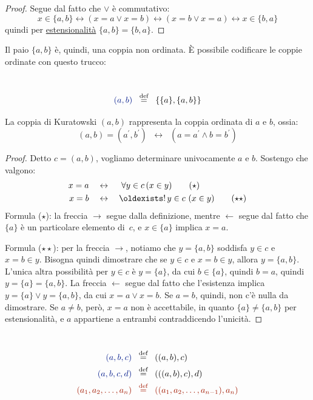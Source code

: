 \begin{proof}
	Segue dal fatto che $\lor$ \`e commutativo:
	\[ x \in \{a,b\} \leftrightarrow (x = a \lor x = b) \leftrightarrow (x = b \lor x = a) \leftrightarrow x \in \{b,a\}
		\]
	quindi per \hyperref[ax2]{estensionalit\`a} $\{a,b\} = \{b,a\}$.
\end{proof}

Il paio $\{a,b\}$ \`e, quindi, una coppia non ordinata. \`E possibile
codificare le coppie ordinate con questo trucco:

\begin{definition}
\ \\
\baselineskip
	\[{\drkblu (a,b)} \;\;\Mydef\;\; \{\{a\},\{a,b\}\}
		\]
\end{definition}

\begin{proposition}
	La coppia di Kuratowski $(a,b)$ rappresenta la coppia ordinata di
$a$ e $b$, ossia:
	\[ (a,b) = (a^{\prime},b^{\prime}) \;\;\leftrightarrow\;\; (a = a^{\prime} \land b = b^{\prime})
		\]
\end{proposition}

\begin{proof}
	Detto $c = (a,b)$, vogliamo determinare univocamente $a$ e $b$.
Sostengo che valgono:
\begin{align*}
	x = a &\quad\leftrightarrow\quad \phantom{!}\forall {y \in c} \,(x \in y)
\tag{$\star$}\\
	x = b &\quad\leftrightarrow\quad \existsun {y \in c} \,(x \in y)
\tag{$\star\star$}
\end{align*}
	Formula ($\star$): la freccia $\rightarrow$ segue dalla definizione, mentre
$\leftarrow$ segue dal fatto che $\{a\}$ \`e un particolare elemento
di~$c$, e $x\in\{a\}$ implica $x=a$.

	Formula ($\star\star$): per la freccia $\rightarrow$, notiamo che
$y=\{a,b\}$ soddisfa $y\in c$ e $x=b\in y$. Bisogna quindi dimostrare che
se $y\in c$ e $x=b\in y$, allora $y=\{a,b\}$. L'unica altra possibilit\`a
per $y\in c$ \`e $y=\{a\}$, da cui $b\in\{a\}$, quindi $b=a$, quindi $y=\{a\}=\{a,b\}$.
La freccia $\leftarrow$ segue dal fatto che l'esistenza implica $y=\{a\}
\lor y=\{a,b\}$, da cui $x=a \lor
x=b$. Se $a=b$, quindi, non c'\`e nulla da dimostrare. Se $a\neq b$,
per\`o, $x=a$ non \`e accettabile, in quanto $\{a\}\neq\{a,b\}$ per
estensionalit\`a, e $a$ appartiene a entrambi contraddicendo l'unicit\`a.
\end{proof}

\begin{definition}
\ 
\baselineskip
	\begin{align*}
	   {\drkblu (a,b,c)} &\;\;\Mydef\;\; ((a,b),c) \\
	   {\drkblu (a,b,c,d)} &\;\;\Mydef\;\; (((a,b),c),d) \\
	   \drkred (a_1,a_2,\ldots,a_n) &\drkred\;\;\Mydef\;\;
((a_1,a_2,\ldots,a_{n-1}),a_n)
	\end{align*}
\end{definition}

